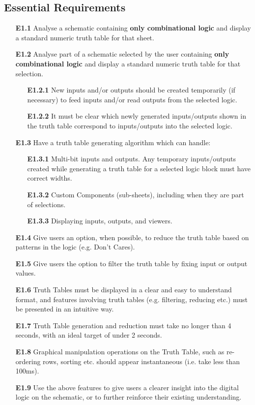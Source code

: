 \subsection*{Essential Requirements}
\begin{itemize}
    \item[\textbf{E1.1}] Analyse a schematic containing \textbf{only combinational logic} and display a standard numeric truth table for that sheet.
    \medskip
    \item[\textbf{E1.2}] Analyse part of a schematic selected by the user containing \textbf{only combinational logic} and display a standard numeric truth table for that selection.
    \begin{itemize}
        \item[\textbf{E1.2.1}] New inputs and/or outputs should be created temporarily (if necessary) to feed inputs and/or read outputs from the selected logic.
        \item[\textbf{E1.2.2}] It must be clear which newly generated inputs/outputs shown in the truth table correspond to inputs/outputs into the selected logic.
    \end{itemize}
    \medskip
    \item[\textbf{E1.3}] Have a truth table generating algorithm which can handle:
    \begin{itemize}
        \item[\textbf{E1.3.1}] Multi-bit inputs and outputs. Any temporary inputs/outputs created while generating a truth table for a selected logic block must have correct widths.
        \item[\textbf{E1.3.2}] Custom Components (sub-sheets), including when they are part of selections.
        \item[\textbf{E1.3.3}] Displaying inputs, outputs, and viewers.
    \end{itemize}
    \medskip
    \item[\textbf{E1.4}] Give users an option, when possible, to reduce the truth table based on patterns in the logic (e.g. Don't Cares).
    \medskip
    \item[\textbf{E1.5}] Give users the option to filter the truth table by fixing input or output values.
    \medskip
    \item[\textbf{\textbf{E1.6}}] Truth Tables must be displayed in a clear and easy to understand format, and features involving truth tables (e.g. filtering, reducing etc.) must be presented in an intuitive way.
    \item[\textbf{\textbf{E1.7}}] Truth Table generation and reduction must take no longer than 4 seconds, with an ideal target of under 2 seconds.
    \item[\textbf{\textbf{E1.8}}] Graphical manipulation operations on the Truth Table, such as re-ordering rows, sorting etc. should appear instantaneous (i.e. take less than 100ms).
    \item[\textbf{E1.9}] Use the above features to give users a clearer insight into the digital logic on the schematic, or to further reinforce their existing understanding.
\end{itemize}

